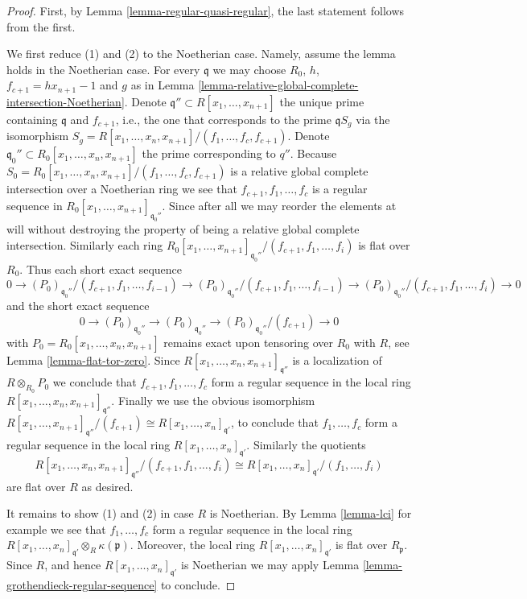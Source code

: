\begin{proof}
First, by Lemma \ref{lemma-regular-quasi-regular}, the last statement
follows from the first.

\medskip\noindent
We first reduce (1) and (2) to the Noetherian case.
Namely, assume the lemma holds in the Noetherian case.
For every $\mathfrak q$ we may choose $R_0$, $h$,
$f_{c + 1} = hx_{n + 1} - 1$ and $g$
as in Lemma \ref{lemma-relative-global-complete-intersection-Noetherian}.
Denote $\mathfrak q'' \subset R[x_1, \ldots, x_{n + 1}]$ the unique
prime containing $\mathfrak q$ and $f_{c + 1}$, i.e., the one that
corresponds to the prime $\mathfrak qS_g$ via the isomorphism
$S_g = R[x_1, \ldots, x_n, x_{n + 1}]/(f_1, \ldots, f_c, f_{c + 1})$.
Denote $\mathfrak q_0'' \subset R_0[x_1, \ldots, x_n, x_{n + 1}]$
the prime corresponding to $q''$. Because
$S_0 = R_0[x_1, \ldots, x_n, x_{n + 1}]/(f_1, \ldots, f_c, f_{c + 1})$
is a relative global complete intersection over a Noetherian ring
we see that $f_{c + 1}, f_1, \ldots, f_c$ is a regular sequence
in $R_0[x_1, \ldots, x_{n + 1}]_{\mathfrak q_0''}$. Since after all
we may reorder the elements at will without destroying the
property of being a relative global complete intersection.
Similarly each ring
$R_0[x_1, \ldots, x_{n + 1}]_{\mathfrak q_0''}/(f_{c + 1}, f_1, \ldots, f_i)$
is flat over $R_0$. Thus each short exact sequence
$$
0 \to
(P_0)_{\mathfrak q_0''}/(f_{c + 1}, f_1, \ldots, f_{i - 1})
\to
(P_0)_{\mathfrak q_0''}/(f_{c + 1}, f_1, \ldots, f_{i - 1})
\to
(P_0)_{\mathfrak q_0''}/(f_{c + 1}, f_1, \ldots, f_i)
\to
0
$$
and the short exact sequence
$$
0 \to
(P_0)_{\mathfrak q_0''}
\to
(P_0)_{\mathfrak q_0''}
\to
(P_0)_{\mathfrak q_0''}/(f_{c + 1})
\to
0
$$
with $P_0 = R_0[x_1, \ldots, x_n, x_{n + 1}]$ remains exact upon tensoring
over $R_0$ with $R$, see Lemma \ref{lemma-flat-tor-zero}.
Since $R[x_1, \ldots, x_n, x_{n + 1}]_{\mathfrak q''}$ is a
localization of $R \otimes_{R_0} P_0$ we conclude that
$f_{c + 1}, f_1, \ldots, f_c$ form a regular sequence in the local ring
$R[x_1, \ldots, x_n, x_{n + 1}]_{\mathfrak q''}$.
Finally we use the obvious isomorphism
$R[x_1, \ldots, x_{n + 1}]_{\mathfrak q''}/(f_{c + 1})
\cong R[x_1, \ldots, x_n]_{\mathfrak q'}$, to conclude that
$f_1, \ldots, f_c$ form a regular sequence in the local ring
$R[x_1, \ldots, x_n]_{\mathfrak q'}$. Similarly
the quotients
$$
R[x_1, \ldots, x_n, x_{n + 1}]_{\mathfrak q''}/(f_{c + 1}, f_1, \ldots, f_i)
\cong R[x_1, \ldots, x_n]_{\mathfrak q'}/(f_1, \ldots, f_i)
$$
are flat over $R$ as desired.

\medskip\noindent
It remains to show (1) and (2) in case $R$ is Noetherian.
By Lemma \ref{lemma-lci} for example we see that $f_1, \ldots, f_c$
form a regular sequence in the local ring
$R[x_1, \ldots, x_n]_{\mathfrak q'}\otimes_R \kappa(\mathfrak p)$.
Moreover, the local ring $R[x_1, \ldots, x_n]_{\mathfrak q'}$
is flat over $R_{\mathfrak p}$. Since $R$, and hence
$R[x_1, \ldots, x_n]_{\mathfrak q'}$ is Noetherian we
may apply Lemma \ref{lemma-grothendieck-regular-sequence}
to conclude.
\end{proof}

